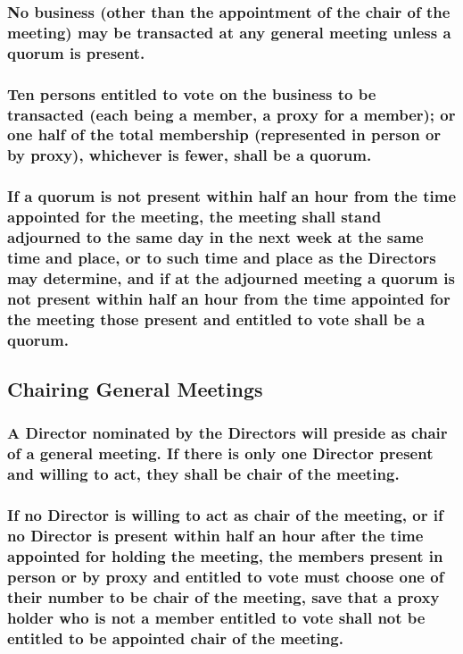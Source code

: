 \documentclass[12pt]{article}
\begin{document}
\subsubsection[Quorum is Necessary for Business at Meetings]{No business (other than the appointment of the chair of the meeting) may be transacted at any general meeting unless a quorum is present.}
\subsubsection[Specifics of Quorum Constitution]{Ten persons entitled to vote on the business to be transacted (each being a member, a proxy for a member); or one half of the total membership (represented in person or by proxy), whichever is fewer, shall be a quorum.}
\subsubsection[Adjournment as Result of No Quorum]{If a quorum is not present within half an hour from the time appointed for the meeting, the meeting shall stand adjourned to the same day in the next week at the same time and place, or to such time and place as the Directors may determine, and if at the adjourned meeting a quorum is not present within half an hour from the time appointed for the meeting those present and entitled to vote shall be a quorum.}

\subsection{Chairing General Meetings}\label{subsection:chairgen}
\subsubsection[A Director Chairs a General Meeting]{A Director nominated by the Directors will preside as chair of a general meeting. If there is only one Director present and willing to act, they shall be chair of the meeting.} \label{subsubsection:nomchair}
\subsubsection[Members May Elect Chair in Absence of Suitable Director]{If no Director is willing to act as chair of the meeting, or if no Director is present within half an hour after the time appointed for holding the meeting, the members present in person or by proxy and entitled to vote must choose one of their number to be chair of the meeting, save that a proxy holder who is not a member entitled to vote shall not be entitled to be appointed chair of the meeting.}
\end{document}
